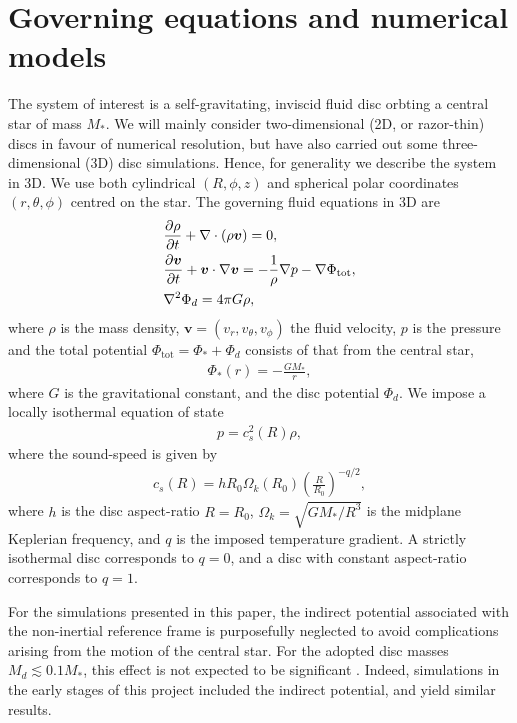\section{Governing equations and numerical models}\label{model} 
The system of interest is a self-gravitating, inviscid fluid disc
orbting a central star of mass $M_*$. We will mainly consider two-dimensional
(2D, or razor-thin) discs in favour of numerical
resolution, but have also carried out some three-dimensional (3D) disc
simulations. Hence, for generality we describe the system in
3D. We use both cylindrical $(R,\phi,z)$ and spherical polar
coordinates $(r,\theta,\phi)$ centred on the star. 
The governing fluid equations in 3D are  
\begin{align}
  &\frac{\partial\rho}{\partial t} + \nabla\cdot\left(\rho\bm{v}\right) =
  0,\label{cont_eq}\\
  &\frac{\partial\bm{v}}{\partial t} + \bm{v}\cdot\nabla\bm{v} = -\frac{1}{\rho}\nabla
  p -\nabla \Phi_\mathrm{tot}\label{mom_eq},\\ 
  & \nabla^2\Phi_d = 4 \pi G \rho \label{poisson}, 
\end{align}
where $\rho$ is the mass density, $\bm{v}=(v_r,v_\theta,v_\phi)$ the
fluid velocity, $p$ is the pressure and the total potential
$\Phi_\mathrm{tot} = \Phi_* + \Phi_d$ consists of that from the
central star, 
\begin{align}
  \Phi_*(r) = -\frac{GM_*}{r}, 
\end{align}
where $G$ is the gravitational constant,  and the disc potential
$\Phi_d$. We impose a locally 
isothermal equation of state 
\begin{align}
  p = c_s^2(R)\rho,
\end{align}
where the sound-speed is given by 
\begin{align}\label{sound-speed}
  c_s(R) = hR_0\Omega_k(R_0)\left(\frac{R}{R_0}\right)^{-q/2}, 
\end{align}
where $h$ is the disc aspect-ratio $R=R_0$, 
$\Omega_k=\sqrt{GM_*/R^3}$ is the midplane Keplerian frequency, and
$q$ is the imposed temperature gradient. A strictly isothermal disc
corresponds to $q=0$, and a disc with constant aspect-ratio
corresponds to $q=1$.   

For the simulations presented in this paper, the indirect potential
associated with the non-inertial reference frame is purposefully 
neglected to avoid complications arising from the motion of the
central star. For the adopted disc masses $M_d\lesssim 0.1 M_*$, this
effect is not expected to be significant \citep{adams89}. Indeed,
simulations in the early stages of this project included the indirect
potential, and yield similar results. 

